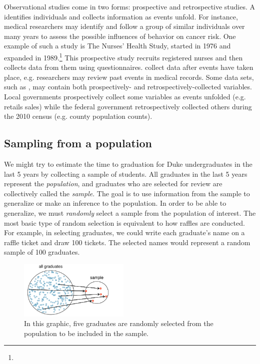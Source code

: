 Observational studies come in two forms: prospective and retrospective studies. A  identifies individuals and collects information as events unfold. For instance, medical researchers may identify and follow a group of similar individuals over many years to assess the possible influences of behavior on cancer risk. One example of such a study is The Nurses' Health Study, started in 1976 and expanded in 1989.\footnote{} This prospective study recruits registered nurses and then collects data from them using questionnaires.  collect data after events have taken place, e.g. researchers may review past events in medical records. Some data sets, such as , may contain both prospectively- and retrospectively-collected variables. Local governments prospectively collect some variables as events unfolded (e.g. retails sales) while the federal government retrospectively collected others during the 2010 census (e.g. county population counts).


\subsection{Sampling from a population}


We might try to estimate the time to graduation for Duke undergraduates in the last 5 years by collecting a sample of students. All graduates in the last 5 years represent the \emph{population}, and graduates who are selected for review are collectively called the \emph{sample}. The goal is to use information from the sample to generalize or make an inference to the population.  In order to be able to generalize, we must \emph{randomly} select a sample from the population of interest. The most basic type of random selection is equivalent to how raffles are conducted. For example, in selecting graduates, we could write each graduate's name on a raffle ticket and draw 100 tickets. The selected names would represent a random sample of 100 graduates.

\begin{figure}[ht]
\centering
\includegraphics[width=0.47\textwidth]{ch_data_collection/figures/popToSample/popToSampleGraduates}
\caption{In this graphic, five graduates are randomly selected from the population to be included in the sample.}
\label{popToSampleGraduates}
\end{figure}

